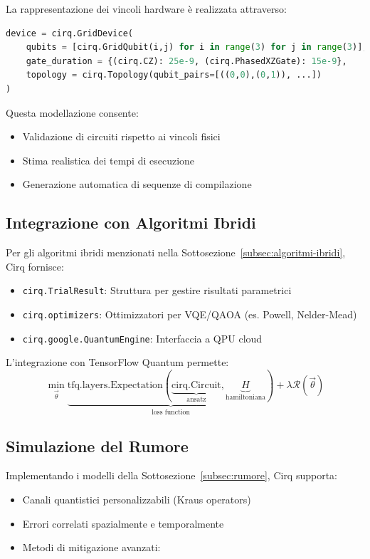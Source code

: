 \documentclass[a4paper,12pt]{report}
\theoremstyle{plain}
\begin{document}
La rappresentazione dei vincoli hardware è realizzata attraverso:
\begin{lstlisting}[language=Python,caption=Esempio di dispositivo hardware-aware in Cirq]
device = cirq.GridDevice(
    qubits = [cirq.GridQubit(i,j) for i in range(3) for j in range(3)],
    gate_duration = {(cirq.CZ): 25e-9, (cirq.PhasedXZGate): 15e-9},
    topology = cirq.Topology(qubit_pairs=[((0,0),(0,1)), ...])
)
\end{lstlisting}

Questa modellazione consente:
\begin{itemize}
    \item Validazione di circuiti rispetto ai vincoli fisici
    \item Stima realistica dei tempi di esecuzione
    \item Generazione automatica di sequenze di compilazione
\end{itemize}

\subsection{Integrazione con Algoritmi Ibridi}
\label{subsec:cirq-hybrid}

Per gli algoritmi ibridi menzionati nella Sottosezione~\ref{subsec:algoritmi-ibridi}, Cirq fornisce:
\begin{itemize}
    \item \texttt{cirq.TrialResult}: Struttura per gestire risultati parametrici
    \item \texttt{cirq.optimizers}: Ottimizzatori per VQE/QAOA (es. Powell, Nelder-Mead)
    \item \texttt{cirq.google.QuantumEngine}: Interfaccia a QPU cloud
\end{itemize}

L'integrazione con TensorFlow Quantum permette:
\begin{equation}
\min_{\vec{\theta}} \underbrace{\text{tfq.layers.Expectation}( \underbrace{\text{cirq.Circuit}}_{\text{ansatz}}, \underbrace{H}_{\text{hamiltoniana}} )}_{\text{loss function}} + \lambda \mathcal{R}(\vec{\theta})
\end{equation}

\subsection{Simulazione del Rumore}
\label{subsec:cirq-noise}

Implementando i modelli della Sottosezione~\ref{subsec:rumore}, Cirq supporta:
\begin{itemize}
    \item Canali quantistici personalizzabili (Kraus operators)
    \item Errori correlati spazialmente e temporalmente
    \item Metodi di mitigazione avanzati:
\end{itemize}
\end{document}
